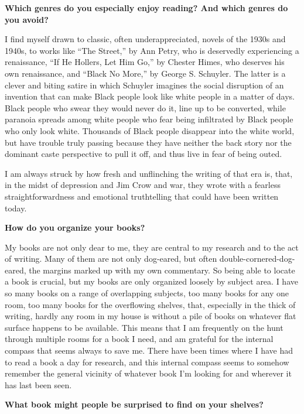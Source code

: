 \textbf{Which genres do you especially enjoy reading? And which genres
do you avoid?}

I find myself drawn to classic, often underappreciated, novels of the
1930s and 1940s, to works like ``The Street,'' by Ann Petry, who is
deservedly experiencing a renaissance, ``If He Hollers, Let Him Go,'' by
Chester Himes, who deserves his own renaissance, and ``Black No More,''
by George S. Schuyler. The latter is a clever and biting satire in which
Schuyler imagines the social disruption of an invention that can make
Black people look like white people in a matter of days. Black people
who swear they would never do it, line up to be converted, while
paranoia spreads among white people who fear being infiltrated by Black
people who only look white. Thousands of Black people disappear into the
white world, but have trouble truly passing because they have neither
the back story nor the dominant caste perspective to pull it off, and
thus live in fear of being outed.

I am always struck by how fresh and unflinching the writing of that era
is, that, in the midst of depression and Jim Crow and war, they wrote
with a fearless straightforwardness and emotional truthtelling that
could have been written today.

\textbf{How do you organize your books?}

My books are not only dear to me, they are central to my research and to
the act of writing. Many of them are not only dog-eared, but often
double-cornered-dog-eared, the margins marked up with my own commentary.
So being able to locate a book is crucial, but my books are only
organized loosely by subject area. I have so many books on a range of
overlapping subjects, too many books for any one room, too many books
for the overflowing shelves, that, especially in the thick of writing,
hardly any room in my house is without a pile of books on whatever flat
surface happens to be available. This means that I am frequently on the
hunt through multiple rooms for a book I need, and am grateful for the
internal compass that seems always to save me. There have been times
where I have had to read a book a day for research, and this internal
compass seems to somehow remember the general vicinity of whatever book
I'm looking for and wherever it has last been seen.

\textbf{What book might people be surprised to find on your shelves?}

